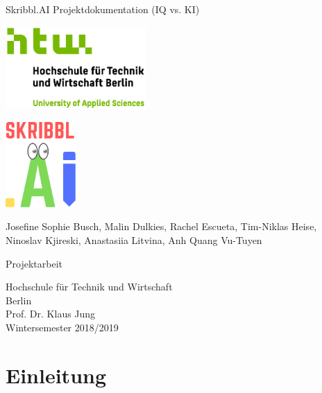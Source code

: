 \documentclass[11pt]{article}
\begin{document}
\begin{titlepage}
   \begin{center}
       \vspace*{1cm}

       \Huge
       Skribbl.AI Projektdokumentation (IQ vs. KI)
       \vspace{1.5cm}

       \includegraphics[width=0.4\textwidth]{images/logo_htw.jpg}

       \vspace{1.0cm}
       \includegraphics[width=0.2\textwidth]{images/logo_skribbl.png}
       \vspace{1.0cm}

       \LARGE

       Josefine Sophie Busch, Malin Dulkies, Rachel Escueta, Tim-Niklas Heise, Ninoslav Kjireski, Anastasiia Litvina, Anh Quang Vu-Tuyen

       \vfill

       Projektarbeit \\

       \vspace{0.8cm}

       Hochschule für Technik und Wirtschaft\\
       Berlin\\

       Prof. Dr. Klaus Jung\\
       Wintersemester 2018/2019\\
       
          \end{center}
\end{titlepage}
\pagebreak
\tableofcontents
\pagebreak
\listoftables
\listoffigures
\pagebreak

\section{Einleitung}
\label{chap: Einleitung}
\end{document}
